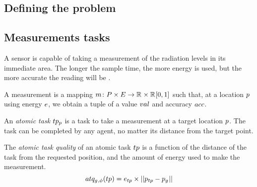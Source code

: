

\subsection{Defining the problem}


\newcommand{\varMeasurementValue}[2]{\varSymbol{val}{#1}{#2}}
\newcommand{\varMeasurementAccuracy}[2]{\varSymbol{acc}{#1}{#2}}
\newcommand{\varLocation}[2]{\varSymbol{p}{#1}{#2}}
\newcommand{\setLocation}[2]{\setSymbol{P}{#1}{#2}}
\newcommand{\varEnergy}[2]{\varSymbol{e}{#1}{#2}}
\newcommand{\setEnergy}[2]{\setSymbol{E}{#1}{#2}}
\newcommand{\formalMeasurement}[2]{
	\functionFormal{m}
	{\setLocation{}{} \times \setEnergy{}{}}
	{\setRealNumbers{}{} \times \setRealNumbersUnit{}{}}
}

\subsection{Measurements tasks}
A sensor is capable of taking a measurement of the radiation levels in its immediate area. The longer the sample time, the more energy is used, but the more accurate the reading will be \citep{dummy}.
\begin{definition}[Measurement]
	A measurement is a mapping $\formalMeasurement{}{}$ such that, at a location $\varLocation{}{}$ using energy $\varEnergy{}{}$, we obtain a tuple of a value $\varMeasurementValue{}{}$ and accuracy $\varMeasurementAccuracy{}{}$.
\end{definition}


\begin{definition}
	An \textit{atomic task} $\varAtomicTask{\varLocation{}{}}{}$ is a task to take a measurement at a target location $\varLocation{}{}$. The task can be completed by any agent, no matter its distance from the target point.
\end{definition}

\newcommand{\functionAtomicTaskQualitySignature}[2]{
	\functionSignature{atq_{\varAgent{}{}, \varTime{}{}}} {\varAtomicTask{}{}}
}

\begin{definition}
	The \textit{atomic task quality} of an atomic task $\varAtomicTask{}{}$ is a function of the distance of the task from the requested position, and the amount of energy used to make the measurement.
	\begin{equation}
		\functionAtomicTaskQualitySignature{}{} = \varEnergy{\varAtomicTask{}{}}{} \times \funcSize{\funcSize{\varLocation{\varAtomicTask{}{}}{} - \varLocation{\varAgent{}{}}{}}{}}{}
	\end{equation}
\end{definition}

